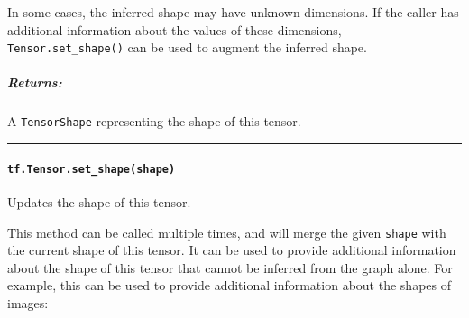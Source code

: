 In some cases, the inferred shape may have unknown dimensions. If the
caller has additional information about the values of these dimensions,
\lstinline{Tensor.set_shape()} can be used to augment the inferred shape.

\subparagraph{Returns: }\label{returns-21}

A \lstinline{TensorShape} representing the shape of this tensor.

\begin{center}\rule{0.5\linewidth}{\linethickness}\end{center}

\paragraph{\texorpdfstring{\lstinline{tf.Tensor.set_shape(shape)}
}{tf.Tensor.set_shape(shape) }}\label{tf.tensor.setux5fshapeshape}

Updates the shape of this tensor.

This method can be called multiple times, and will merge the given
\lstinline{shape} with the current shape of this tensor. It can be used to
provide additional information about the shape of this tensor that
cannot be inferred from the graph alone. For example, this can be used
to provide additional information about the shapes of images:

\begin{Shaded}
\begin{Highlighting}[]
\OperatorTok{=} 
\OperatorTok{=} \OperatorTok{=}\NormalTok{)}

 
\OperatorTok{==>} \NormalTok{TensorShape([Dimension(}\NormalTok{)])}

\NormalTok{image.set_shape([}\NormalTok{, }\NormalTok{, }\NormalTok{])}
 
\OperatorTok{==>} \NormalTok{TensorShape([Dimension(}\NormalTok{)])}
\end{Highlighting}
\end{Shaded}

